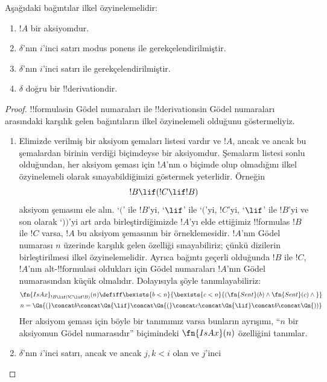 \begin{prop}
Aşağıdaki bağıntılar ilkel özyinelemelidir:
\begin{enumerate}
\item $!A$ bir aksiyomdur.
\item $\delta$'nın $i$'inci satırı modus ponens ile gerekçelendirilmiştir.
\item $\delta$'nın $i$'inci satırı \QR{} ile gerekçelendirilmiştir.
\item $\delta$ doğru bir !!{derivation}{}dir.
\end{enumerate}
\end{prop}

\begin{proof}
!!{formula}s{}in Gödel numaraları ile !!{derivation}s{}in Gödel numaraları
arasındaki karşılık gelen bağıntıların ilkel özyinelemeli olduğunu
göstermeliyiz.
\begin{enumerate}
\item Elimizde verilmiş bir aksiyom şemaları listesi vardır ve $!A$, ancak ve
  ancak bu şemalardan birinin verdiği biçimdeyse bir aksiyomdur. Şemaların
  listesi sonlu olduğundan, her aksiyom şeması için $!A$'nın o biçimde olup
  olmadığını ilkel özyinelemeli olarak sınayabildiğimizi göstermek yeterlidir.
  Örneğin
  \[
  !B \lif (!C \lif !B)
  \]
  aksiyom şemasını ele alın. `$($' ile $!B$'yi, `$\lif$' ile `$($'yi,
  $!C$'yi, `$\lif$' ile $!B$'yi ve son olarak `$))$'yi art arda
  birleştirdiğimizde $!A$'yı elde ettiğimiz !!{formula}s $!B$ ile $!C$ varsa,
  $!A$ bu aksiyom şemasının bir örneklemesidir. $!A$'nın Gödel numarası $n$
  üzerinde karşılık gelen özelliği sınayabiliriz; çünkü dizilerin
  birleştirilmesi ilkel özyinelemelidir. Ayrıca bağıntı geçerli olduğunda
  $!B$ ile $!C$, $!A$'nın alt-!!{formula}s{}i oldukları için Gödel numaraları
  $!A$'nın Gödel numarasından küçük olmalıdır. Dolayısıyla şöyle
  tanımlayabiliriz:
  \begin{multline*}
  \fn{IsAx}_{!B \lif (!C \lif !B)}(n) \defiff \bexists{b< n}{
    \bexists{c < n}{(\fn{Sent}(b) \land \fn{Sent}(c) \land {}}}\\ n =
  \Gn{(} \concat b \concat \Gn{\lif} \concat \Gn{(} \concat c \concat
  \Gn{\lif} \concat b \concat \Gn{))}
  \end{multline*}
  Her aksiyom şeması için böyle bir tanımımız varsa bunların ayrışımı,
  ``$n$ bir aksiyomun Gödel numarasıdır'' biçimindeki $\fn{IsAx}(n)$
  özelliğini tanımlar.
\item $\delta$'nın $i$'inci satırı, ancak ve ancak $j,k<i$ olan ve $j$'inci

\end{enumerate}
\end{proof}
